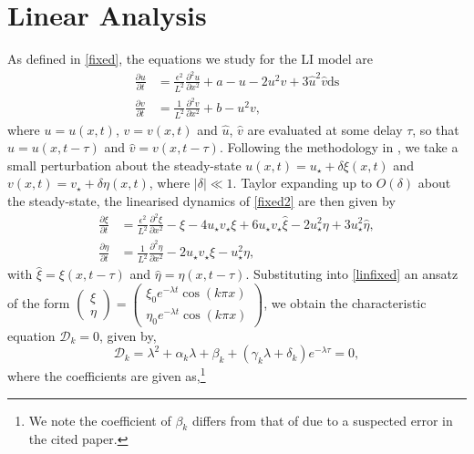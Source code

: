\section{Linear Analysis}
As defined in \eqref{fixed}, the equations we study for the LI model are
\begin{equation}\label{fixed2}
  \begin{split}
  \frac{\partial u}{\partial t}&=\frac{\epsilon^2}{L^2}\frac{\partial^2u}{\partial x^2}+a-u-2u^2v+3\hat{u}^2\hat{v} \text{ds}\\
  \frac{\partial v}{\partial t}&=\frac{1}{L^2}\frac{\partial^2v}{\partial x^2}+b-u^2v,
\end{split}
\end{equation}
where $u=u(x,t)$, $v=v(x,t)$ and $\hat{u}$, $\hat{v}$ are evaluated at some delay $\tau$, so that $\hat{u}=u(x,t-\tau)$ and $\hat{v}=v(x,t-\tau)$. Following the methodology in \cite{yigaffneyli}, we take a small perturbation about the steady-state $u(x,t)=u_\star+\delta\xi(x,t)$ and $v(x,t)=v_\star+\delta\eta(x,t)$, where $|\delta|\ll 1$. Taylor expanding up to $O(\delta)$ about the steady-state, the linearised dynamics of \eqref{fixed2} are then given by
\begin{equation}\label{linfixed}
  \begin{split}
\frac{\partial\xi}{\partial t}&=\frac{\epsilon^2}{L^2}\frac{\partial^2\xi}{\partial x^2}-\xi-4u_\star v_\star\xi+6u_\star v_\star\hat{\xi}-2u_\star^2\eta+3u_\star^2\hat{\eta},\\
\frac{\partial\eta}{\partial t}&=\frac{1}{L^2}\frac{\partial^2\eta}{\partial x^2}-2u_\star v_\star\xi-u_\star^2\eta,
\end{split}
\end{equation}
with $\hat{\xi}=\xi(x,t-\tau)$ and $\hat{\eta}=\eta(x,t-\tau)$. Substituting into \eqref{linfixed} an ansatz of the form $\begin{pmatrix}\xi\\\eta\end{pmatrix}=\begin{pmatrix}\xi_0e^{-\lambda t}\cos(k\pi x)\\ \eta_0e^{-\lambda t}\cos(k\pi x)\end{pmatrix}$, we obtain the characteristic equation $\mathcal{D}_k=0$, given by,
\begin{equation}\label{characfix}
\mathcal{D}_k=\lambda^2+\alpha_k\lambda+\beta_k+(\gamma_k\lambda+\delta_k)e^{-\lambda\tau}=0,
\end{equation}
where the coefficients are given as,\footnote{We note the coefficient of $\beta_k$ differs from that of \cite{yigaffneyli} due to a suspected error in the cited paper.}
